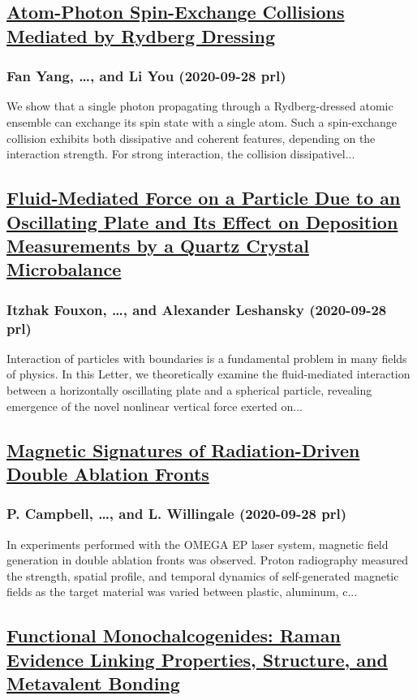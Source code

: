 \subsection*{\href{http://link.aps.org/doi/10.1103/PhysRevLett.125.143601}{Atom-Photon Spin-Exchange Collisions Mediated by Rydberg Dressing}}
\subsubsection*{Fan Yang, \dots, and Li You (2020-09-28 prl)}
We show that a single photon propagating through a Rydberg-dressed atomic ensemble can exchange its spin state with a single atom. Such a spin-exchange collision exhibits both dissipative and coherent features, depending on the interaction strength. For strong interaction, the collision dissipativel...
\subsection*{\href{http://link.aps.org/doi/10.1103/PhysRevLett.125.144501}{Fluid-Mediated Force on a Particle Due to an Oscillating Plate and Its Effect on Deposition Measurements by a Quartz Crystal Microbalance}}
\subsubsection*{Itzhak Fouxon, \dots, and Alexander Leshansky (2020-09-28 prl)}
Interaction of particles with boundaries is a fundamental problem in many fields of physics. In this Letter, we theoretically examine the fluid-mediated interaction between a horizontally oscillating plate and a spherical particle, revealing emergence of the novel nonlinear vertical force exerted on...
\subsection*{\href{http://link.aps.org/doi/10.1103/PhysRevLett.125.145001}{Magnetic Signatures of Radiation-Driven Double Ablation Fronts}}
\subsubsection*{P. Campbell, \dots, and L. Willingale (2020-09-28 prl)}
In experiments performed with the OMEGA EP laser system, magnetic field generation in double ablation fronts was observed. Proton radiography measured the strength, spatial profile, and temporal dynamics of self-generated magnetic fields as the target material was varied between plastic, aluminum, c...
\subsection*{\href{http://link.aps.org/doi/10.1103/PhysRevLett.125.145301}{Functional Monochalcogenides: Raman Evidence Linking Properties, Structure, and Metavalent Bonding}}
